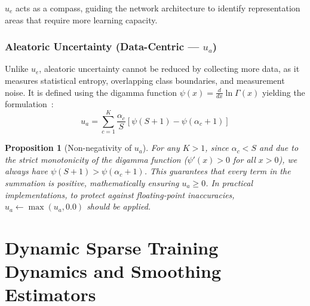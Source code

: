 \documentclass[11pt, a4paper]{article}
\newtheorem{proposition}{Proposition}
\begin{document}
$u_e$ acts as a compass, guiding the network architecture to identify representation areas that require more learning capacity.

\subsubsection{Aleatoric Uncertainty (Data-Centric --- $u_a$)}

Unlike $u_e$, aleatoric uncertainty cannot be reduced by collecting more data, as it measures statistical entropy, overlapping class boundaries, and measurement noise. It is defined using the digamma function $\psi(x) = \frac{d}{dx} \ln \Gamma(x)$ yielding the formulation~\cite{malinin2018predictive}:
\begin{equation}\label{eq:u_a}
    u_a = \sum_{c=1}^K \frac{\alpha_c}{S} \left[\psi(S + 1) - \psi(\alpha_c + 1)\right]
\end{equation}

\begin{proposition}[Non-negativity of $u_a$]
For any $K > 1$, since $\alpha_c < S$ and due to the strict monotonicity of the digamma function ($\psi'(x) > 0$ for all $x > 0$), we always have $\psi(S + 1) > \psi(\alpha_c + 1)$. This guarantees that every term in the summation is positive, mathematically ensuring $u_a \ge 0$. In practical implementations, to protect against floating-point inaccuracies, $u_a \leftarrow \max(u_a, 0.0)$ should be applied.
\end{proposition}

\section{Dynamic Sparse Training Dynamics and Smoothing Estimators}\label{sec:sparse}
\end{document}
